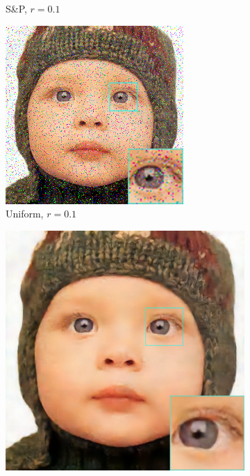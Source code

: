 \begin{figure}
\begin{subfigure}{0.24\textwidth}
		\caption{S\&P, $r=0.1$}
	\end{subfigure}
	\begin{subfigure}{0.24\textwidth}
		\includegraphics[width=\textwidth]{images/exp1.2/uniform0.png}
		\caption{Uniform, $r=0.1$}
	\end{subfigure}
	\begin{subfigure}{0.24\textwidth}
		\includegraphics[width=\textwidth]{images/exp1.2/gaussian.png}

\end{subfigure}
\end{figure}
